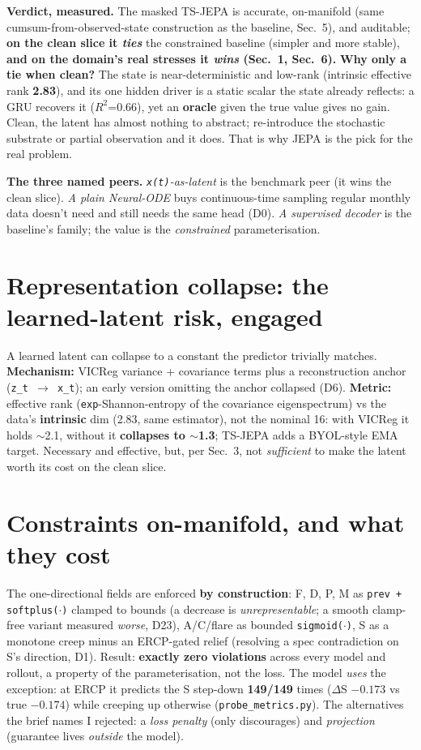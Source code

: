 \textbf{Verdict, measured.} The masked TS-JEPA is accurate, on-manifold (same cumsum-from-observed-state
construction as the baseline, Sec.~5), and auditable; \textbf{on the clean slice it \textit{ties}} the
constrained baseline (simpler and more stable), \textbf{and on the domain's real stresses it \textit{wins}
(Sec.~1, Sec.~6).} \textbf{Why only a tie when clean?} The state is near-deterministic and low-rank (intrinsic
effective rank \textbf{2.83}), and its one hidden driver is a static scalar the state already reflects:
a GRU recovers it ($R^2$=0.66), yet an \textbf{oracle} given the true value gives no gain. Clean, the
latent has almost nothing to abstract; re-introduce the stochastic substrate or partial observation and it
does. That is why JEPA is the pick for the real problem.

\textbf{The three named peers.} \textit{\texttt{x(t)}-as-latent} is the benchmark peer (it wins the clean
slice). \textit{A plain Neural-ODE} buys continuous-time sampling regular monthly data doesn't need and
still needs the same head (D0). \textit{A supervised decoder} is the baseline's family; the value is the
\textit{constrained} parameterisation.

\section{Representation collapse: the learned-latent risk, engaged}

A learned latent can collapse to a constant the predictor trivially matches. \textbf{Mechanism:} VICReg
variance + covariance terms plus a reconstruction anchor (\texttt{z\_t $\to$ x\_t}); an early version
omitting the anchor collapsed (D6). \textbf{Metric:} effective rank (\texttt{exp}-Shannon-entropy of the
covariance eigenspectrum) vs the data's \textbf{intrinsic} dim (2.83, same estimator), not the nominal 16:
with VICReg it holds $\sim$2.1, without it \textbf{collapses to $\sim$1.3}; TS-JEPA adds a BYOL-style EMA
target. Necessary and effective, but, per Sec.~3, not \textit{sufficient} to make the latent worth its
cost on the clean slice.

\section{Constraints on-manifold, and what they cost}

The one-directional fields are enforced \textbf{by construction}: F, D, P, M as \texttt{prev + softplus($\cdot$)}
clamped to bounds (a decrease is \textit{unrepresentable}; a smooth clamp-free variant measured
\textit{worse}, D23), A/C/flare as bounded \texttt{sigmoid($\cdot$)}, S as a monotone creep minus an
ERCP-gated relief (resolving a spec contradiction on S's direction, D1). Result: \textbf{exactly zero
violations} across every model and rollout, a property of the parameterisation, not the loss. The model
\textit{uses} the exception: at ERCP it predicts the S step-down \textbf{149/149} times ($\Delta$S $-0.173$
vs true $-0.174$) while creeping up otherwise (\texttt{probe\_metrics.py}). The alternatives the brief
names I rejected: a \textit{loss penalty} (only discourages) and \textit{projection} (guarantee lives
\textit{outside} the model).

